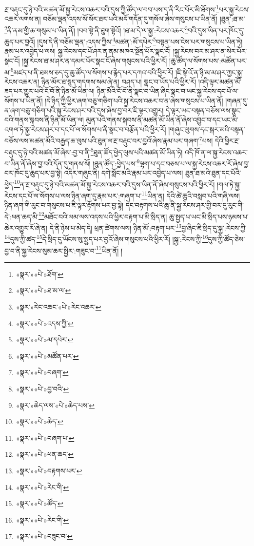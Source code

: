 རྔ་བརྡུང་དུ་ཉེ་བའི་མཚན་མོ་སྐྱ་རེངས་འཆར་བའི་དུས་ཀྱི་ཚོད་ལ་བབ་པས་ད་ནི་རིང་པོར་མི་ཐོགས་\footnote{«སྣར་»«པེ་»ཐོག་}པར་སྐྱ་རེངས་འཆར་ལགས་ན། བཅོམ་ལྡན་འདས་སོ་སོར་ཐར་པའི་མདོ་གདོན་དུ་གསོལ་ཞེས་གསུངས་པ་ཡིན་ནོ། །ཐུན་:ཐ་མ་\footnote{«སྣར་»«པེ་»ཐ་མ་ལ་}ནི་ནམ་གྱི་ཆ་གསུམ་པ་ཡིན་ནོ། །བབ་སྟེ་ནི་ཐུག་སྟེའོ། །ཐ་མ་དེ་ལ་སྐྱ་:རེངས་འཆར་\footnote{«སྣར་»རེང་འཆང་«པེ་»རེང་འཆར་}བའི་དུས་ཡིན་པར་ཁོང་དུ་ཆུད་པར་བྱའོ། །དུས་དེ་ནི་བཅོམ་ལྡན་:འདས་ཀྱིས་\footnote{«སྣར་»«པེ་»འདས་ཀྱི་}མཚན་:མོ་དཔེར་\footnote{«སྣར་»«པེ་»མ་དཔེར་}བསྟན་པས་ངེས་པར་གསུངས་པ་ཡིན་ཏེ། རྣམ་པར་འབྱེད་པ་ལས། སྐྱ་རེངས་དང་པོ་ཤར་ན་ནམ་མཁའ་སྔོན་པོར་སྣང་ངོ། །སྐྱ་རེངས་བར་མ་ཤར་ན་སེར་པོར་སྣང་ངོ། །སྐྱ་རེངས་ཐ་མ་ཤར་ན་དམར་པོར་སྣང་ངོ་ཞེས་གསུངས་པའི་ཕྱིར་རོ། །ཆུ་ཚོད་ལ་སོགས་པས་:མཚོན་པར་མ་\footnote{«སྣར་»«པེ་»མཚོན་པར་}མཛད་པ་ནི་ཐམས་ཅད་དུ་ཆུ་ཚོད་ལ་སོགས་པ་རྙེད་པར་དཀའ་བའི་ཕྱིར་རོ། །ཇི་སྟེ་འོ་ན་ཉི་མ་མ་ཤར་ཀྱང་སྐྱ་རེངས་འཆར་ན། ཉིན་མོར་ཐ་སྙད་གདགས་སམ་ཞེ་ན། བཤད་པ། སྣང་བ་ཡོད་པའི་ཕྱིར་རོ། །འདི་ལྟར་མཚན་མོ་ཟད་པར་གྱུར་པའི་ངོ་བོ་ནི་ཉིན་མོ་ཡིན་ལ། ཉིན་མོའི་ངོ་བོ་ནི་སྣང་བ་ཡིན་ཞིང་སྣང་བ་ཡང་སྐྱ་རེངས་དང་པོ་ལ་སོགས་པ་ཡིན་ནོ། །དེ་ཉིད་ཀྱི་ཕྱིར་ཞག་བཅུ་གཅིག་པའི་སྐྱ་རེངས་འཆར་བ་ན་ཞེས་གསུངས་པ་ཡིན་ནོ། །གཞན་དུ་ན་ཞག་བཅུ་གཅིག་པའི་སྐྱ་རེངས་ཤར་བའི་དུས་ཞེས་བྱ་བར་ཇི་ལྟར་འགྱུར། དེ་ལྟར་ཡང་བསྟན་བཅོས་ལས་སྣང་བའི་གནས་སྐབས་ནི་ཉིན་མོ་ཡིན་ལ། མུན་པའི་གནས་སྐབས་ནི་མཚན་མོ་ཡིན་ནོ་ཞེས་འབྱུང་བ་དང་ཡང་མི་འགལ་ཏེ་སྐྱ་རེངས་ཤར་བ་དང་པོ་ལ་སོགས་པ་ནི་སྣང་བ་བརྩོན་པའི་ཕྱིར་རོ། །གཞུང་ལུགས་དང་སྐར་མའི་བསྟན་བཅོས་ལས་མཚན་མོའི་བརྒྱད་ཆ་ལུས་པའི་ཐུན་ལ་རྔ་བརྡུང་བར་བྱའོ་ཞེས་རྣམ་པར་གཞག་\footnote{«སྣར་»«པེ་»བཞག་}པས། དེའི་ཕྱིར་རྔ་བརྡུང་དུ་ཉེ་བའི་མཚན་མོ་ཞེས་:བྱ་བ་ནི་\footnote{«སྣར་»«པེ་»བྱ་བའི་}ཐུན་ཚོད་ཕྱེད་ལུས་པའི་མཚན་མོ་ཡིན་ཏེ། འདི་ཁོ་ན་ལ་སྐྱ་རེངས་འཆར་བ་ཡིན་ནོ་ཞེས་བྱ་བའི་དོན་དུ་གནས་སོ། །ཐུན་ཚོད་:ཕྱེད་པས་\footnote{«སྣར་»ཆེད་ལས་«པེ་»ཆེད་པས་}ལྷག་པ་དང་བཅས་པ་ལ་སྐྱ་རེངས་འཆར་རོ་ཞེས་བྱ་བར་ཁོང་དུ་ཆུད་པར་བྱ་སྟེ། འདིར་གཞུང་ནི། དགེ་སློང་མའི་རྣམ་པར་འབྱེད་པ་ལས། ཐུན་ཐ་མའི་ཐུན་དང་པོའི་ཕྱེད་\footnote{«སྣར་»«པེ་»ཆེད་}ན་རྔ་བརྡུང་དུ་ཉེ་བའི་མཚན་མོ་སྐྱ་རེངས་འཆར་བའི་དུས་ཡིན་ནོ་ཞེས་གསུངས་པའི་ཕྱིར་རོ། །གལ་ཏེ་སྐྱ་རེངས་དང་པོ་ལ་སོགས་པ་ལས་ཉིན་ཞག་དུ་རྣམ་པར་:གཞག་པ་\footnote{«སྣར་»«པེ་»བཞག་པ་}ཡིན་ན། དེའི་ཚེ་ཆུའི་བསླབ་པའི་གཞི་ལས། ཉིན་ཞག་གི་རུང་བ་གསུངས་པ་ཇི་ལྟར་རྟོགས་པར་བྱ་སྟེ། དེང་བརྟགས་པའི་ཆུ་ནི་སྐྱ་རེངས་ཤར་གྱི་བར་དུ་རུང་གི་དེ་:ཕན་ཆད་མི་\footnote{«སྣར་»«པེ་»ཕན་ཆད་}མཐོང་བའི་ལམ་ལས་འདས་པའི་ཕྱིར་བརྟག་པ་མི་སྲིད་ན། ཆུ་སྤྱད་པ་ཡང་མི་སྲིད་པས་ཉམས་པ་ཆེར་འགྱུར་རོ་ཞེ་ན། དེ་ནི་ཉེས་པ་མེད་དེ། ཕྲན་ཚེགས་ལས། ཉིན་མོ་:བརྟག་པར་\footnote{«སྣར་»«པེ་»བརྟགས་པར་}བྱ་ཞིང་ཇི་སྲིད་དུ་སྐྱ་:རེངས་ཀྱི་\footnote{«སྣར་»«པེ་»རེང་གི་}དུས་ཀྱི་ཚད་\footnote{«སྣར་»«པེ་»ཚོད་}དེ་སྲིད་དུ་ཡོངས་སུ་སྤྱད་པར་བྱའོ་ཞེས་གསུངས་པའི་ཕྱིར་རོ། །སྐྱ་:རེངས་ཀྱི་\footnote{«སྣར་»«པེ་»རེང་གི་}དུས་ཀྱི་ཚོད་ཅེས་བྱ་བ་ནི་སྐྱ་རེངས་སུམ་ཆར་སྤྱིར་:གཟུང་བ་\footnote{«སྣར་»«པེ་»བཟུང་བ་}ཡིན་ནོ། །

